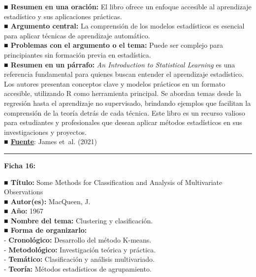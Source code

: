 \documentclass[
  letterpaper,
  DIV=11,
  numbers=noendperiod]{scrreprt}
\begin{document}
\textbf{■ Resumen en una oración:} El libro ofrece un enfoque accesible
al aprendizaje estadístico y sus aplicaciones prácticas.\\
\textbf{■ Argumento central:} La comprensión de los modelos estadísticos
es esencial para aplicar técnicas de aprendizaje automático.\\
\textbf{■ Problemas con el argumento o el tema:} Puede ser complejo para
principiantes sin formación previa en estadística.\\
\textbf{■ Resumen en un párrafo:} \emph{An Introduction to Statistical
Learning} es una referencia fundamental para quienes buscan entender el
aprendizaje estadístico. Los autores presentan conceptos clave y modelos
prácticos en un formato accesible, utilizando R como herramienta
principal. Se abordan temas desde la regresión hasta el aprendizaje no
supervisado, brindando ejemplos que facilitan la comprensión de la
teoría detrás de cada técnica. Este libro es un recurso valioso para
estudiantes y profesionales que desean aplicar métodos estadísticos en
sus investigaciones y proyectos.\\
\textbf{■ \href{https://www.statlearning.com}{Fuente}}: James et~al.
(2021)

\begin{center}\rule{0.5\linewidth}{0.5pt}\end{center}

\textbf{Ficha 16:}

\textbf{■ Título:} Some Methods for Classification and Analysis of
Multivariate Observations\\
\textbf{■ Autor(es):} MacQueen, J.\\
\textbf{■ Año:} 1967\\
\textbf{■ Nombre del tema:} Clustering y clasificación.\\
\textbf{■ Forma de organizarlo:}\\
- \textbf{Cronológico:} Desarrollo del método K-means.\\
- \textbf{Metodológico:} Investigación teórica y práctica.\\
- \textbf{Temático:} Clasificación y análisis multivariado.\\
- \textbf{Teoría:} Métodos estadísticos de agrupamiento.
\end{document}
